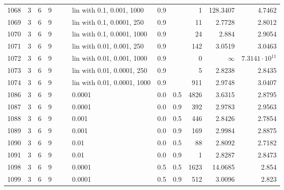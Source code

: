 \begin{longtable}{lrrrrrlrrrrr}
1068 &       3 & 6 & 9 &   &   &   lin with 0.1, 0.001, 1000 &  0.9 &        &       1 &               128.3407 &                 4.7462 \\
1069 &       3 & 6 & 9 &   &   &   lin with 0.1, 0.0001, 250 &  0.9 &        &      11 &                 2.7728 &                 2.8012 \\
1070 &       3 & 6 & 9 &   &   &  lin with 0.1, 0.0001, 1000 &  0.9 &        &      24 &                  2.884 &                 2.9054 \\
1071 &       3 & 6 & 9 &   &   &   lin with 0.01, 0.001, 250 &  0.9 &        &     142 &                 3.0519 &                 3.0463 \\
1072 &       3 & 6 & 9 &   &   &  lin with 0.01, 0.001, 1000 &  0.9 &        &       0 &               $\infty$ &  $7.3141\cdot 10^{11}$ \\
1073 &       3 & 6 & 9 &   &   &  lin with 0.01, 0.0001, 250 &  0.9 &        &       5 &                 2.8238 &                 2.8435 \\
1074 &       3 & 6 & 9 &   &   & lin with 0.01, 0.0001, 1000 &  0.9 &        &     911 &                 2.9748 &                 3.0407 \\
1086 &       3 & 6 & 9 &   &   &                      0.0001 &  0.0 &    0.5 &    4826 &                 3.6315 &                 2.8795 \\
1087 &       3 & 6 & 9 &   &   &                      0.0001 &  0.0 &    0.9 &     392 &                 2.9783 &                 2.9563 \\
1088 &       3 & 6 & 9 &   &   &                       0.001 &  0.0 &    0.5 &     446 &                 2.8426 &                 2.7854 \\
1089 &       3 & 6 & 9 &   &   &                       0.001 &  0.0 &    0.9 &     169 &                 2.9984 &                 2.8875 \\
1090 &       3 & 6 & 9 &   &   &                        0.01 &  0.0 &    0.5 &      88 &                 2.8092 &                 2.7182 \\
1091 &       3 & 6 & 9 &   &   &                        0.01 &  0.0 &    0.9 &       1 &                 2.8287 &                 2.8473 \\
1098 &       3 & 6 & 9 &   &   &                      0.0001 &  0.5 &    0.5 &    1623 &                14.0685 &                  2.854 \\
1099 &       3 & 6 & 9 &   &   &                      0.0001 &  0.5 &    0.9 &     512 &                 3.0096 &                  2.823 \\

\end{longtable}
